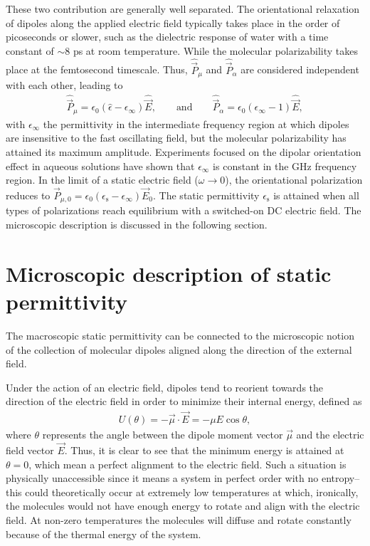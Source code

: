These two contribution are generally well separated. The orientational relaxation of dipoles along the applied electric field typically takes place in the order of picoseconds or slower, such as the dielectric response of water with a time constant of $\sim$8 ps at room temperature. While the molecular polarizability takes place at the femtosecond timescale. Thus, $\hat{\vec{P}}_\mu$ and $\hat{\vec{P}}_\alpha$ are considered independent with each other, leading to
\begin{eqnarray}
\hat{\vec{P}}_\mu = \epsilon_0 (\hat{\epsilon} - \epsilon_\infty) \hat{\vec{E}} \label{separationPolarization1}, \qquad \text{and} \qquad \hat{\vec{P}}_\alpha = \epsilon_0 (\epsilon_\infty - 1) \hat{\vec{E}},
\label{separationPolarization2}
\end{eqnarray}
\noindent with $\epsilon_\infty$ the permittivity in the intermediate frequency region at which dipoles are insensitive to the fast oscillating field, but the molecular polarizability has attained its maximum amplitude. Experiments focused on the dipolar orientation effect in aqueous solutions have shown that $\epsilon_\infty$ is constant in the GHz frequency region.\!\cite{Lileev2007} In the limit of a static electric field ($\omega \to 0$), the orientational polarization reduces to $\vec{P}_{\mu,0} = \epsilon_0 ( \epsilon_{\text{s}} - \epsilon_\infty) \vec{E}_0 $. The static permittivity $\epsilon_\text{s}$ is attained when all types of polarizations reach equilibrium with a switched-on DC electric field. The microscopic description is discussed in the following section.



\section{Microscopic description of static permittivity}



The macroscopic static permittivity can be connected to the microscopic notion of the collection of molecular dipoles aligned along the direction of the external field. 



Under the action of an electric field, dipoles tend to reorient towards the direction of the electric field in order to minimize their internal energy, defined as
\begin{eqnarray}
U (\theta) = - \vec{\mu} \cdot \vec{E} = - \mu E \cos{\theta},
\label{PotentialPolarization}
\end{eqnarray} 
where $\theta$ represents the angle between the dipole moment vector $\vec{\mu}$ and the electric field vector $\vec{E}$. Thus, it is clear to see that the minimum energy is attained at $\theta=0$, which mean a perfect alignment to the electric field. Such a situation is physically unaccessible since it means a system in perfect order with no entropy--this could theoretically occur at extremely low temperatures at which, ironically, the molecules would not have enough energy to rotate and align with the electric field. At non-zero temperatures the molecules will diffuse and rotate constantly because of the thermal energy of the system. 



